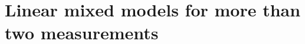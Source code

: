 \documentclass[]{book}\usepackage[]{graphicx}\usepackage[]{color}
\begin{document}
% 
% 
% 
% 
% 
% 
% 
% 
% 
% 



\chapter{Linear mixed models for more than two measurements}\label{chap:premidpost}
\end{document}
